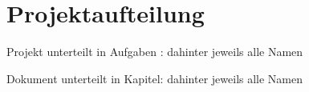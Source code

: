 \section{Projektaufteilung}

Projekt unterteilt in Aufgaben : dahinter jeweils alle Namen

Dokument unterteilt in Kapitel: dahinter jeweils alle Namen